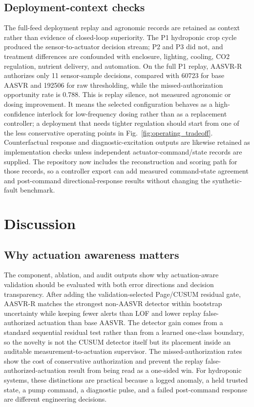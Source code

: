 \documentclass[preprint,12pt,doubleblind]{elsarticle}
\begin{document}
\subsection{Deployment-context checks}
The full-feed deployment replay and agronomic records are retained as context rather than evidence of closed-loop superiority. The P1 hydroponic crop cycle produced the sensor-to-actuator decision stream; P2 and P3 did not, and treatment differences are confounded with enclosure, lighting, cooling, CO2 regulation, nutrient delivery, and automation. On the full P1 replay, AASVR-R authorizes only 11 sensor-sample decisions, compared with 60723 for base AASVR and 192506 for raw thresholding, while the missed-authorization opportunity rate is 0.788. This is replay silence, not measured agronomic or dosing improvement. It means the selected configuration behaves as a high-confidence interlock for low-frequency dosing rather than as a replacement controller; a deployment that needs tighter regulation should start from one of the less conservative operating points in Fig.~\ref{fig:operating_tradeoff}. Counterfactual response and diagnostic-excitation outputs are likewise retained as implementation checks unless independent actuator-command/state records are supplied. The repository now includes the reconstruction and scoring path for those records, so a controller export can add measured command-state agreement and post-command directional-response results without changing the synthetic-fault benchmark.

\FloatBarrier

\section{Discussion}
\subsection{Why actuation awareness matters}
The component, ablation, and audit outputs show why actuation-aware validation should be evaluated with both error directions and decision transparency. After adding the validation-selected Page/CUSUM residual gate, AASVR-R matches the strongest non-AASVR detector within bootstrap uncertainty while keeping fewer alerts than LOF and lower replay false-authorized actuation than base AASVR. The detector gain comes from a standard sequential residual test rather than from a learned one-class boundary, so the novelty is not the CUSUM detector itself but its placement inside an auditable measurement-to-actuation supervisor. The missed-authorization rates show the cost of conservative authorization and prevent the replay false-authorized-actuation result from being read as a one-sided win. For hydroponic systems, these distinctions are practical because a logged anomaly, a held trusted state, a pump command, a diagnostic pulse, and a failed post-command response are different engineering decisions.
\end{document}
